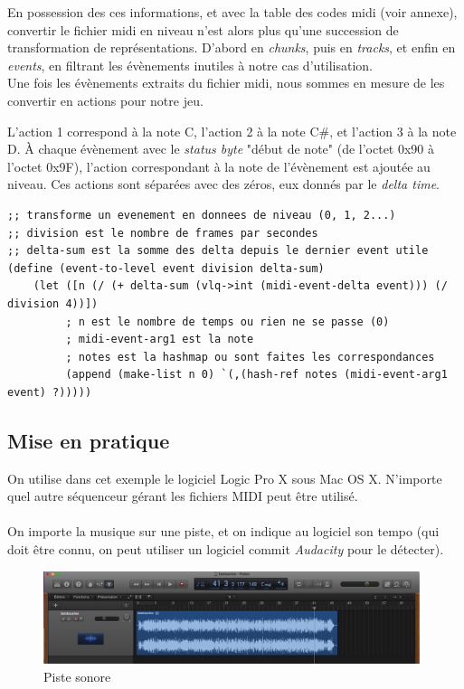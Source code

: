 En possession des ces informations, et avec la table des codes midi (voir annexe), convertir le fichier midi en niveau n'est alors plus qu'une succession de transformation de représentations. D'abord en \textit{chunks}, puis en \textit{tracks}, et enfin en \textit{events}, en filtrant les évènements inutiles à notre cas d'utilisation.\\
Une fois les évènements extraits du fichier midi, nous sommes en mesure de les convertir en actions pour notre jeu.

L'action 1 correspond à la note C, l'action 2 à la note C\#, et l'action 3 à la note D.
À chaque évènement avec le \textit{status byte} "début de note" (de l'octet 0x90 à l'octet 0x9F), l'action correspondant à la note de l'évènement est ajoutée au niveau. Ces actions sont séparées avec des zéros, eux donnés par le \textit{delta time}.\\

\begin{lstlisting}[style=Scheme]
;; transforme un evenement en donnees de niveau (0, 1, 2...)
;; division est le nombre de frames par secondes
;; delta-sum est la somme des delta depuis le dernier event utile
(define (event-to-level event division delta-sum)
    (let ([n (/ (+ delta-sum (vlq->int (midi-event-delta event))) (/ division 4))])
         ; n est le nombre de temps ou rien ne se passe (0)
         ; midi-event-arg1 est la note
         ; notes est la hashmap ou sont faites les correspondances
         (append (make-list n 0) `(,(hash-ref notes (midi-event-arg1 event) ?)))))
\end{lstlisting}


\subsection{Mise en pratique}
On utilise dans cet exemple le logiciel Logic Pro X sous Mac OS X. N'importe quel autre séquenceur gérant les fichiers MIDI peut être utilisé.\\

\paragraph{}
On importe la musique sur une piste, et on indique au logiciel son tempo (qui doit être connu, on peut utiliser un logiciel commit \textit{Audacity} pour le détecter).

\begin{figure}[H]\centering
  \includegraphics[width=11cm]{./img/logic_sound.png}
  \caption{Piste sonore}
\end{figure}

